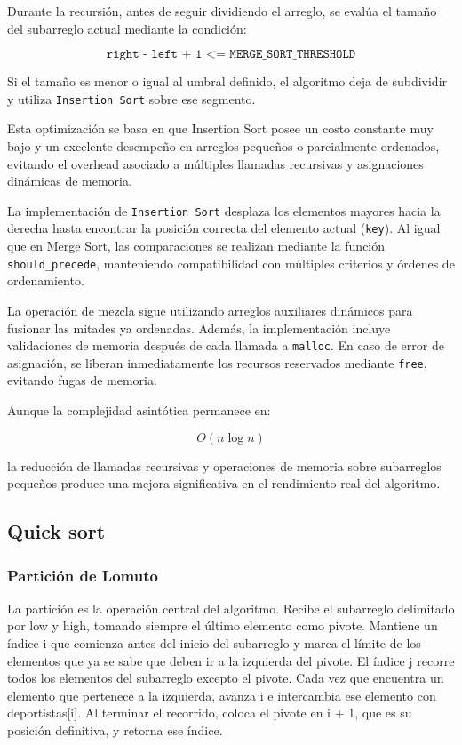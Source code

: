 Durante la recursión, antes de seguir dividiendo el arreglo, se evalúa el tamaño del subarreglo actual mediante la condición:

\[
\texttt{right - left + 1 <= MERGE\_SORT\_THRESHOLD}
\]

Si el tamaño es menor o igual al umbral definido, el algoritmo deja de subdividir y utiliza \texttt{Insertion Sort} sobre ese segmento.

Esta optimización se basa en que Insertion Sort posee un costo constante muy bajo y un excelente desempeño en arreglos pequeños o parcialmente ordenados, evitando el overhead asociado a múltiples llamadas recursivas y asignaciones dinámicas de memoria.

La implementación de \texttt{Insertion Sort} desplaza los elementos mayores hacia la derecha hasta encontrar la posición correcta del elemento actual (\texttt{key}). Al igual que en Merge Sort, las comparaciones se realizan mediante la función \texttt{should\_precede}, manteniendo compatibilidad con múltiples criterios y órdenes de ordenamiento.

La operación de mezcla sigue utilizando arreglos auxiliares dinámicos para fusionar las mitades ya ordenadas. Además, la implementación incluye validaciones de memoria después de cada llamada a \texttt{malloc}. En caso de error de asignación, se liberan inmediatamente los recursos reservados mediante \texttt{free}, evitando fugas de memoria.

Aunque la complejidad asintótica permanece en:

\[
O(n \log n)
\]

la reducción de llamadas recursivas y operaciones de memoria sobre subarreglos pequeños produce una mejora significativa en el rendimiento real del algoritmo.

\subsection{Quick sort}

\subsubsection{Partición de Lomuto}
La partición es la operación central del algoritmo. Recibe el subarreglo delimitado por low y high, tomando siempre el último elemento como pivote. Mantiene un índice i que comienza antes del inicio del subarreglo y marca el límite de los elementos que ya se sabe que deben ir a la izquierda del pivote. El índice j recorre todos los elementos del subarreglo excepto el pivote. Cada vez que encuentra un elemento que pertenece a la izquierda, avanza i e intercambia ese elemento con deportistas[i]. Al terminar el recorrido, coloca el pivote en i + 1, que es su posición definitiva, y retorna ese índice.

